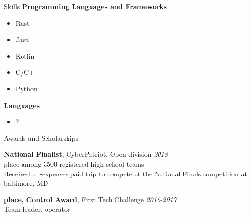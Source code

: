 	\begin{rSection}{Skills}
		{\bf Programming Languages and Frameworks }
		\begin{itemize}
			\item Rust
			\item Java
			\item Kotlin
			\item C/C++
			\item Python
		\end{itemize}
		{\bf Languages}
		\begin{itemize}
			\item ?
		\end{itemize}
	\end{rSection}

	\begin{rSection}{Awards and Scholarships} 

		{\bf National Finalist}{, CyberPatriot, Open division} \hfill{\em 2018} \\
		 place among 3500 registered high school teams \\
		Received all-expenses paid trip to compete at the National Finals competition at baltimore, MD
		
		{\bf {} place, Control Award}{, First Tech Challenge} \hfill{\em 2015-2017} \\
		Team leader,  operator
		
	\end{rSection}



